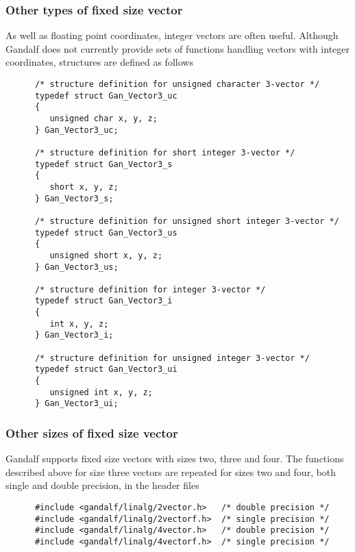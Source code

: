 \subsubsection{Other types of fixed size vector}
As well as floating point coordinates, integer vectors are often useful.
Although Gandalf does not currently provide sets of functions handling
vectors with integer coordinates, structures are defined as follows
\begin{verbatim}
      /* structure definition for unsigned character 3-vector */
      typedef struct Gan_Vector3_uc
      {
         unsigned char x, y, z;
      } Gan_Vector3_uc;

      /* structure definition for short integer 3-vector */
      typedef struct Gan_Vector3_s
      {
         short x, y, z;
      } Gan_Vector3_s;

      /* structure definition for unsigned short integer 3-vector */
      typedef struct Gan_Vector3_us
      {
         unsigned short x, y, z;
      } Gan_Vector3_us;

      /* structure definition for integer 3-vector */
      typedef struct Gan_Vector3_i
      {
         int x, y, z;
      } Gan_Vector3_i;

      /* structure definition for unsigned integer 3-vector */
      typedef struct Gan_Vector3_ui
      {
         unsigned int x, y, z;
      } Gan_Vector3_ui;
\end{verbatim}

\subsubsection{Other sizes of fixed size vector}
Gandalf supports fixed size vectors with sizes two, three and four.
The functions described above for size three vectors are repeated
for sizes two and four, both single and double precision, in the header
files
\begin{verbatim}
      #include <gandalf/linalg/2vector.h>   /* double precision */
      #include <gandalf/linalg/2vectorf.h>  /* single precision */
      #include <gandalf/linalg/4vector.h>   /* double precision */
      #include <gandalf/linalg/4vectorf.h>  /* single precision */
\end{verbatim}

